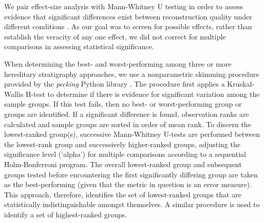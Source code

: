 We pair effect-size analysis with Mann-Whitney U testing in order to assess evidence that significant differences exist between reconstruction quality under different conditions \citep{mann1947on}.
As our goal was to screen for possible effects, rather than establish the veracity of any one effect, we did not correct for multiple comparisons in assessing statistical significance.


When determining the best- and worst-performing among three or more hereditary stratigraphy approaches, we use a nonparametric skimming procedure provided by the \textit{pecking} Python library \citep{moreno2024pecking}.
The procedure first applies a Kruskal-Wallis H-test to determine if there is evidence for significant variation among the sample groups.
If this test fails, then no best- or worst-performing group or groups are identified.
If a significant difference is found, observation ranks are calculated and sample groups are sorted in order of mean rank.
To discern the lowest-ranked group(s), successive Mann-Whitney U-tests are performed between the lowest-rank group and successively higher-ranked groups, adjusting the significance level (`alpha') for multiple comparisons according to a sequential Holm-Bonferroni program.
The overall lowest-ranked group and subsequent groups tested before encountering the first significantly differing group are taken as the best-performing (given that the metric in question is an error measure).
This approach, therefore, identifies the set of lowest-ranked groups that are statistically indistinguishable amongst themselves.
A similar procedure is used to identify a set of highest-ranked groups.
